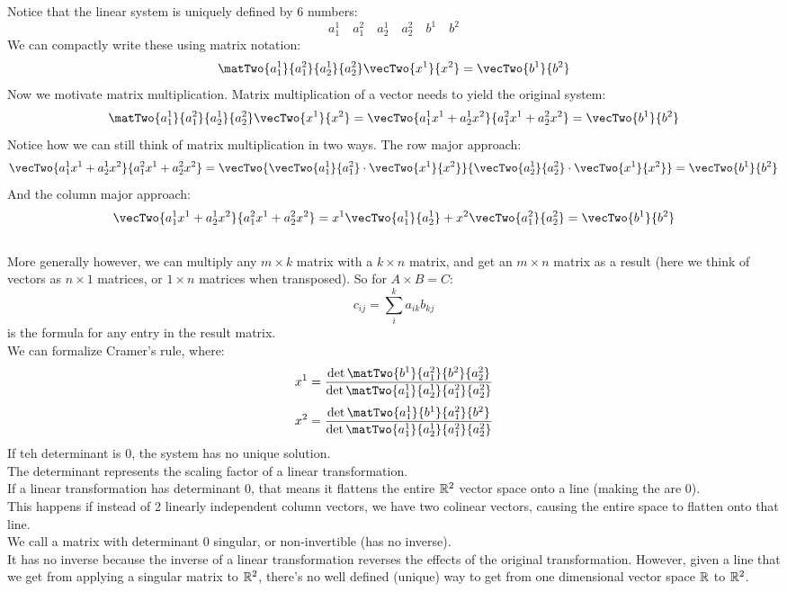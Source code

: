 \documentclass[12pt]{article}
\begin{document}
    Notice that the linear system is uniquely
    defined by 6 numbers:
    \[ a_1^1 \quad a_1^2 \quad a_2^1 \quad a_2^2
    \quad b^1 \quad b^2 \]
    We can compactly write these using matrix notation:
    \[ \matTwo{a_1^1}{a_1^2}{a_2^1}{a_2^2}
    \vecTwo{x^1}{x^2} = \vecTwo{b^1}{b^2} \]
    Now we motivate matrix multiplication.
    Matrix multiplication of a vector needs
    to yield the original system:
    \[ \matTwo{a_1^1}{a_1^2}{a_2^1}{a_2^2}
    \vecTwo{x^1}{x^2}
    = \vecTwo{a_1^1x^1 + a_2^1x^2}{a_1^2x^1 + a_2^2x^2}
    = \vecTwo{b^1}{b^2} \]
    Notice how we can still think of matrix multiplication
    in two ways.
    The row major approach:
    \[ \vecTwo{a_1^1x^1 + a_2^1x^2}{a_1^2x^1 + a_2^2x^2}
    = \vecTwo{\vecTwo{a_1^1}{a_1^2} \cdot \vecTwo{x^1}{x^2}}
    {\vecTwo{a_2^1}{a_2^2} \cdot \vecTwo{x^1}{x^2}}
    = \vecTwo{b^1}{b^2} \]
    And the column major approach:
    \[ \vecTwo{a_1^1x^1 + a_2^1x^2}{a_1^2x^1 + a_2^2x^2}
    = x^1\vecTwo{a_1^1}{a_2^1} + x^2\vecTwo{a_1^2}{a_2^2}
    = \vecTwo{b^1}{b^2} \]
    \\

    More generally however, we can multiply
    any $m \times k$ matrix with a $k \times n$
    matrix, and get an $m\times n$ matrix as a result
    (here we think of vectors as $n \times 1$ matrices,
    or $1 \times n$ matrices when transposed).
    So for $A \times B = C$:
    \[ c_{ij} = \sum_{i}^{k}a_{ik}b_{kj} \]
    is the formula for any entry in the result matrix. \\

    We can formalize Cramer's rule,
    where:
    \[ x^1 = \dfrac{
        \det{\matTwo{b^1}{a_1^2}{b^2}{a_2^2}}
    }{\det{\matTwo{a_1^1}{a_2^1}{a_1^2}{a_2^2}}} \]
    \[ x^2 = \dfrac{
        \det{\matTwo{a_1^1}{b^1}{a_1^2}{b^2}}
    }{\det{\matTwo{a_1^1}{a_2^1}{a_1^2}{a_2^2}}} \]
    If teh determinant is 0, 
    the system has no unique solution. \\

    The determinant represents the scaling
    factor of a linear transformation. \\
    If a linear transformation has determinant 0,
    that means it flattens the entire $\mathbb{R}^2$
    vector space onto a line (making the are 0). \\
    This happens if instead of 2 linearly
    independent column vectors, we have two colinear
    vectors, causing the entire space
    to flatten onto that line. \\
    We call a matrix with determinant 0 singular,
    or non-invertible (has no inverse). \\
    It has no inverse because the inverse
    of a linear transformation reverses the effects
    of the original transformation.
    However, given a line that we get from
    applying a singular matrix to $\mathbb{R}^2$,
    there's no well defined (unique) way to get 
    from one dimensional vector space $\mathbb{R}$ to $\mathbb{R}^2$. \\

 
\end{document}
